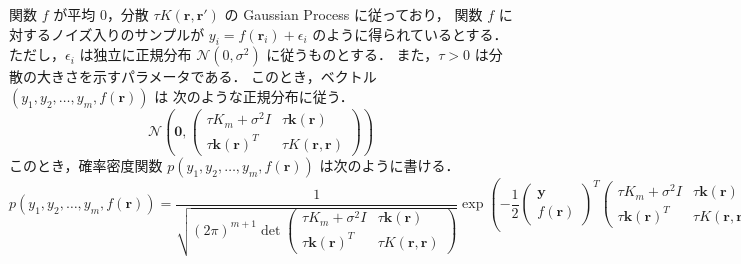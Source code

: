 関数 $f$ が平均 $0$，分散 $\tau K(\bm{r}, \bm{r}')$ の Gaussian Process に従っており，
関数 $f$ に対するノイズ入りのサンプルが $y_i = f(\bm{r}_i) + \epsilon_i$ のように得られているとする．
ただし，$\epsilon_i$ は独立に正規分布 $\mathcal{N}(0, \sigma^2)$ に従うものとする．
また，$\tau > 0$ は分散の大きさを示すパラメータである．
このとき，ベクトル $(y_1, y_2, \ldots, y_m, f(\bm{r}))$ は
次のような正規分布に従う．
\begin{equation}
    \mathcal{N}\left(\bm{0},
    \begin{pmatrix}
        \tau K_m + \sigma^2 I & \tau \bm{k}(\bm{r})    \\
        \tau \bm{k}(\bm{r})^T & \tau K(\bm{r}, \bm{r})
    \end{pmatrix}
    \right)
\end{equation}
このとき，確率密度関数 $p(y_1, y_2, \ldots, y_m, f(\bm{r}))$ は次のように書ける．
\begin{equation}
    p(y_1, y_2, \ldots, y_m, f(\bm{r}))
    = \frac{1}{\sqrt{(2\pi)^{m+1} \det{
                \begin{pmatrix}
                    \tau K_m + \sigma^2 I & \tau \bm{k}(\bm{r})    \\
                    \tau \bm{k}(\bm{r})^T & \tau K(\bm{r}, \bm{r})
                \end{pmatrix}
            }}}
    \exp\left(-\frac{1}{2}
    \begin{pmatrix}
        \bm{y} \\ f(\bm{r})
    \end{pmatrix}^T
    \begin{pmatrix}
        \tau K_m + \sigma^2 I & \tau \bm{k}(\bm{r})    \\
        \tau \bm{k}(\bm{r})^T & \tau K(\bm{r}, \bm{r})
    \end{pmatrix}^{-1}
    \begin{pmatrix}
        \bm{y} \\ f(\bm{r})
    \end{pmatrix}
    \right)
\end{equation}

